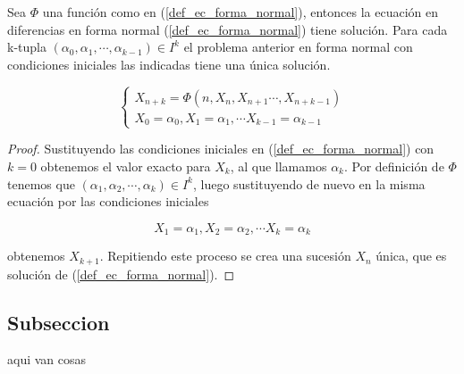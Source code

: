 \begin{theorem}
Sea $\Phi$ una función como en (\ref{def_ec_forma_normal}), entonces la ecuación en diferencias en forma normal (\ref{def_ec_forma_normal}) tiene solución.
Para cada k-tupla $(\alpha_0, \alpha_1, \cdots ,\alpha_{k-1})\in I^{k}$ el problema anterior en forma normal con condiciones iniciales las indicadas tiene una única solución.

\begin{equation}
\begin{cases}
X_{n+k} = \Phi (n, X_n, X_{n+1}\cdots , X_{n+k-1}) \\
X_0 = \alpha_0, X_1=\alpha_1, \cdots X_{k-1}=\alpha_{k-1}
\end {cases}
\end{equation}

\end{theorem}
\begin{proof}
Sustituyendo las condiciones iniciales en (\ref{def_ec_forma_normal}) con $k=0$ obtenemos el valor exacto para $X_k$, al que llamamos $\alpha_k$. Por definición de $\Phi$ tenemos que $(\alpha_1, \alpha_2, \cdots ,\alpha_{k})\in I^{k}$, luego sustituyendo de nuevo en la misma ecuación por las condiciones iniciales

$$X_1 = \alpha_1, X_2=\alpha_2, \cdots X_{k}=\alpha_{k}$$

obtenemos $X_{k+1}$. Repitiendo este proceso se crea una sucesión $X_n$ única, que es solución de (\ref{def_ec_forma_normal}).
\end{proof}



\subsection{Subseccion}

aqui van cosas